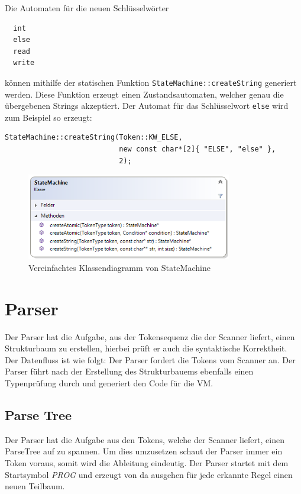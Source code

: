 \documentclass[
	a4paper
]{scrreprt}
\begin{document}
Die Automaten für die neuen Schlüsselwörter    
\begin{lstlisting}     
  int
  else
  read
  write
\end{lstlisting}    
können mithilfe der statischen Funktion \lstinline{StateMachine::createString} generiert werden. Diese Funktion erzeugt einen Zustandsautomaten, welcher genau die übergebenen Strings akzeptiert. Der Automat für das Schlüsselwort \lstinline{else} wird zum Beispiel so erzeugt:
\begin{lstlisting}
StateMachine::createString(Token::KW_ELSE, 
                           new const char*[2]{ "ELSE", "else" }, 
                           2);
\end{lstlisting}

\begin{figure}
\centering
\includegraphics[width=0.8\textwidth]{./images/statemachine.png}
\caption{Vereinfachtes Klassendiagramm von StateMachine}
\end{figure}

\chapter{Parser}
Der Parser hat die Aufgabe, aus der Tokensequenz die der Scanner liefert, einen Strukturbaum zu erstellen, hierbei prüft er auch die syntaktische Korrektheit. Der Datenfluss ist wie folgt: Der Parser fordert die Tokens vom Scanner an. Der Parser führt nach der Erstellung des Strukturbauems ebenfalls einen Typenprüfung durch und generiert den Code für die VM.
\section{Parse Tree}
Der Parser hat die Aufgabe aus den Tokens, welche der Scanner liefert, einen ParseTree auf zu spannen.  Um dies umzusetzen schaut der Parser immer ein Token voraus, somit wird die Ableitung eindeutig. Der Parser startet mit dem Startsymbol \textit{PROG} und erzeugt von da ausgehen für jede erkannte Regel einen neuen Teilbaum.\\
\end{document}
